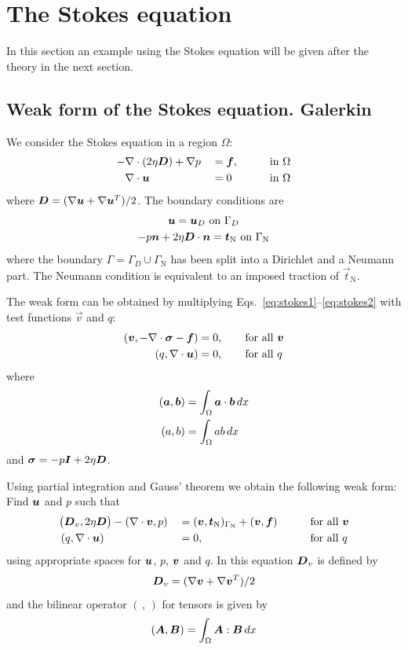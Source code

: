 \clearpage

\section{The Stokes equation}

In this section an example using the Stokes equation will be given after
the theory in the next section.

\subsection{Weak form of the Stokes equation. Galerkin \fem}
\label{sec:stokesweak}

We consider the Stokes equation in a region $\Omega$:
\begin{alignat}{3}
 -&\nabla\cdot(2\eta \boldsymbol{D})+\nabla p & &=\boldsymbol{f},&&\qquad\text{in }\Omega
     \label{eq:stokes1}\\
   &\nabla\cdot\boldsymbol{u}& &=0&&\qquad\text{in }\Omega
     \label{eq:stokes2}
\end{alignat}
where $\boldsymbol{D}=(\nabla\boldsymbol{u}+\nabla\boldsymbol{u}^T)/2$. The boundary conditions are
\begin{gather}
    \boldsymbol{u} = \boldsymbol{u}_D\text{ on }\Gamma_D\\
    -p\boldsymbol{n}+2\eta \boldsymbol{D}\cdot\boldsymbol{n}=\boldsymbol{t}_{\text{N}}
\text{ on }\Gamma_{\text{N}}
\end{gather}
where the boundary $\Gamma=\Gamma_D\cup\Gamma_{\text{N}}$ has been split into a
Dirichlet and a Neumann part. The Neumann condition is equivalent
to an imposed traction of $\vec t_{\text{N}}$.
                                                                                
The weak form can be obtained by multiplying
Eqs.~\eqref{eq:stokes1}--\eqref{eq:stokes2}
with test functions $\vec v$ and $q$:
\begin{align*}
 (\boldsymbol{v},-\nabla\cdot\boldsymbol{\sigma} -\boldsymbol{f})&=0,\qquad\text{for all }\boldsymbol{v}\\
  (q,\nabla\cdot\boldsymbol{u})& =0,\qquad\text{for all }q
\end{align*}
where
\begin{align*}
   (\boldsymbol{a}, \boldsymbol{b})&=\int_\Omega\boldsymbol{a}\cdot\boldsymbol{b}\,d x\\
   (a,b)&=\int_\Omega a b\,d x
\end{align*}
and $\boldsymbol{\sigma} = -p\boldsymbol{I}+2\eta\boldsymbol{D}$.

Using partial integration and Gauss'
theorem we obtain the following weak form: 
Find $\boldsymbol{u}$ and $p$ such that
\begin{alignat}{3}
  &\big(\boldsymbol{D}_v,2\eta\boldsymbol{D}\big)
    -(\nabla\cdot\boldsymbol{v},p)&&=(\boldsymbol{v},\boldsymbol{t}_{\text{N}})_{\Gamma_{\text{N}}}+(\boldsymbol{v},\boldsymbol{f})
&\qquad&\text{for all }\boldsymbol{v}\label{eq:weakst1}\\
  &\,(q,\nabla\cdot\boldsymbol{u})&& =0,&\qquad&\text{for all }q\label{eq:weakst2}
\end{alignat}
using appropriate spaces for $\boldsymbol{u}$, $p$, $\boldsymbol{v}$ and $q$. In this equation
$\boldsymbol{D}_v$ is defined by
\[
\boldsymbol{D}_v=(\nabla\boldsymbol{v}+\nabla\boldsymbol{v}^T)/2
\]
and the bilinear operator $(\,,\,)$ for tensors is given by
\[
   (\boldsymbol{A}, \boldsymbol{B})=\int_\Omega\boldsymbol{A}:\boldsymbol{B}\,d x
\]

